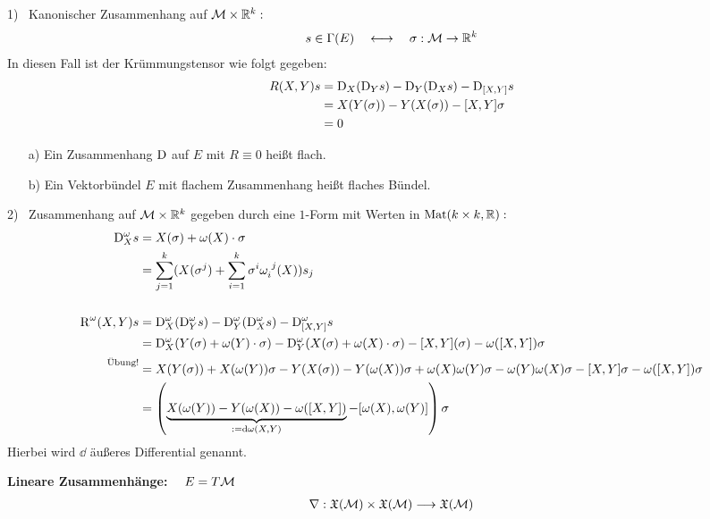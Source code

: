 \begin{bsp}
1) \ Kanonischer Zusammenhang auf $\mathcal{M} \times \mathbb{R}^k:$
\begin{align*}
s \in \Gamma(E) \quad \longleftrightarrow \quad \sigma: \mathcal{M} \rightarrow \mathbb{R}^k 
\end{align*}
In diesen Fall ist der Krümmungstensor wie folgt gegeben:
\begin{align*}
R(X,Y)s &= \mathrm{D}_X(\mathrm{D}_Ys) - \mathrm{D}_Y(\mathrm{D}_Xs) - \mathrm{D}_{[X,Y]}s \\
			&= X(Y(\sigma)) - Y(X(\sigma)) - [X,Y]\sigma \\
			&= 0
\end{align*}
\end{bsp}

\begin{defs}
\begin{itemize}
	\item[a)] Ein Zusammenhang $\mathrm{D}$ auf $E$ mit $R \equiv 0$ heißt flach.
	\item[b)] Ein Vektorbündel $E$ mit flachem Zusammenhang heißt flaches Bündel.
\end{itemize}
\end{defs}

\begin{bsp}
2) \ Zusammenhang auf $\mathcal{M} \times \mathbb{R}^k$ gegeben durch eine $1$-Form mit Werten in $\operatorname{Mat}(k \times k,\mathbb{R}):$
\begin{align*}
\mathrm{D}^{\omega}_X s &= X(\sigma) + \omega(X)\cdot\sigma \\
							&= \sum_{j=1}^{k} (X(\sigma^{j}) + \sum_{i=1}^{k} \sigma^{i}\omega_i^{\phantom{i}j}(X))s_j \\
							\phantom{.} \\
\operatorname{R}^{\omega}(X,Y)s &= \mathrm{D}^{\omega}_X(\mathrm{D}^{\omega}_Ys) - \mathrm{D}^{\omega}_Y(\mathrm{D}^{\omega}_Xs) - \mathrm{D}^{\omega}_{[X,Y]}s \\
&= \mathrm{D}^{\omega}_X(Y(\sigma) + \omega(Y)\cdot\sigma) - \mathrm{D}^{\omega}_Y(X(\sigma)+ \omega(X)\cdot\sigma) - [X,Y](\sigma) - \omega([X,Y]) \sigma \\
\overset{\text{Übung!}}{\phantom{=}} &= X(Y(\sigma)) + X(\omega(Y))\sigma - Y(X(\sigma)) - Y(\omega(X))\sigma + \omega(X)\omega(Y)\sigma - \omega(Y)\omega(X)\sigma - [X,Y]\sigma - \omega([X,Y])\sigma \\
&= \left( \underbrace{X(\omega(Y)) - Y(\omega(X)) - \omega([X,Y])}_{:= \dd\omega(X,Y)} - [\omega(X),\omega(Y)]\right) \sigma
\end{align*}
Hierbei wird $\dd$ äußeres Differential genannt.
\end{bsp}
\textbf{Lineare Zusammenhänge:} $ \quad E= T\mathcal{M}$ 
\begin{align*}
\nabla: \mathfrak{X}(\mathcal{M}) \times \mathfrak{X}(\mathcal{M}) \longrightarrow \mathfrak{X}(\mathcal{M})
\end{align*}

